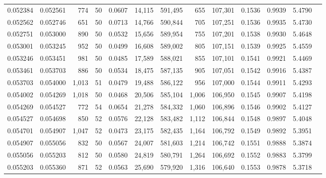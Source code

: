 \begin{tabular}{rrrrrrrrrrrrr}
0.052384 & 0.052561 &   774 &  50 &                                     0.0607 &  14,115 & 591,495 &     655 & 107,301 & 0.1536 & 0.9939 & 5.4790 \\
0.052562 & 0.052746 &   651 &  50 &                                     0.0713 &  14,766 & 590,844 &     705 & 107,251 & 0.1536 & 0.9935 & 5.4730 \\
0.052751 & 0.053000 &   890 &  50 &                                     0.0532 &  15,656 & 589,954 &     755 & 107,201 & 0.1538 & 0.9930 & 5.4648 \\
0.053001 & 0.053245 &   952 &  50 &                                     0.0499 &  16,608 & 589,002 &     805 & 107,151 & 0.1539 & 0.9925 & 5.4559 \\
0.053246 & 0.053451 &   981 &  50 &                                     0.0485 &  17,589 & 588,021 &     855 & 107,101 & 0.1541 & 0.9921 & 5.4469 \\
0.053461 & 0.053703 &   886 &  50 &                                     0.0534 &  18,475 & 587,135 &     905 & 107,051 & 0.1542 & 0.9916 & 5.4387 \\
0.053703 & 0.054000 & 1,013 &  51 &                                     0.0479 &  19,488 & 586,122 &     956 & 107,000 & 0.1544 & 0.9911 & 5.4293 \\
0.054002 & 0.054269 & 1,018 &  50 &                                     0.0468 &  20,506 & 585,104 &   1,006 & 106,950 & 0.1545 & 0.9907 & 5.4198 \\
0.054269 & 0.054527 &   772 &  54 &                                     0.0654 &  21,278 & 584,332 &   1,060 & 106,896 & 0.1546 & 0.9902 & 5.4127 \\
0.054527 & 0.054698 &   850 &  52 &                                     0.0576 &  22,128 & 583,482 &   1,112 & 106,844 & 0.1548 & 0.9897 & 5.4048 \\
0.054701 & 0.054907 & 1,047 &  52 &                                     0.0473 &  23,175 & 582,435 &   1,164 & 106,792 & 0.1549 & 0.9892 & 5.3951 \\
0.054907 & 0.055056 &   832 &  50 &                                     0.0567 &  24,007 & 581,603 &   1,214 & 106,742 & 0.1551 & 0.9888 & 5.3874 \\
0.055056 & 0.055203 &   812 &  50 &                                     0.0580 &  24,819 & 580,791 &   1,264 & 106,692 & 0.1552 & 0.9883 & 5.3799 \\
0.055203 & 0.055360 &   871 &  52 &                                     0.0563 &  25,690 & 579,920 &   1,316 & 106,640 & 0.1553 & 0.9878 & 5.3718 \\

\end{tabular}
